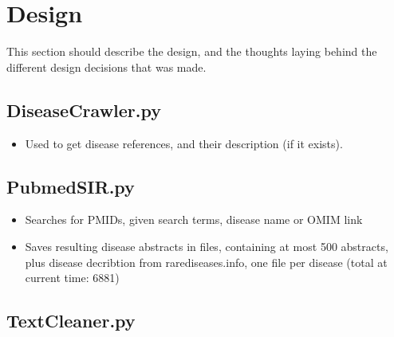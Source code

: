 \section{Design}
This section should describe the design, and the thoughts laying behind the different design decisions that was made.

\subsection{DiseaseCrawler.py}

\begin{itemize}
\item Used to get disease references, and their description (if it exists).

\end{itemize}

\subsection{PubmedSIR.py}

\begin{itemize}

\item Searches for PMIDs, given search terms, disease name or OMIM link
\item Saves resulting disease abstracts in files, containing at most 500 abstracts, plus disease decribtion from rarediseases.info, one file per disease (total at current time: 6881)
\end{itemize}

\subsection{TextCleaner.py}




